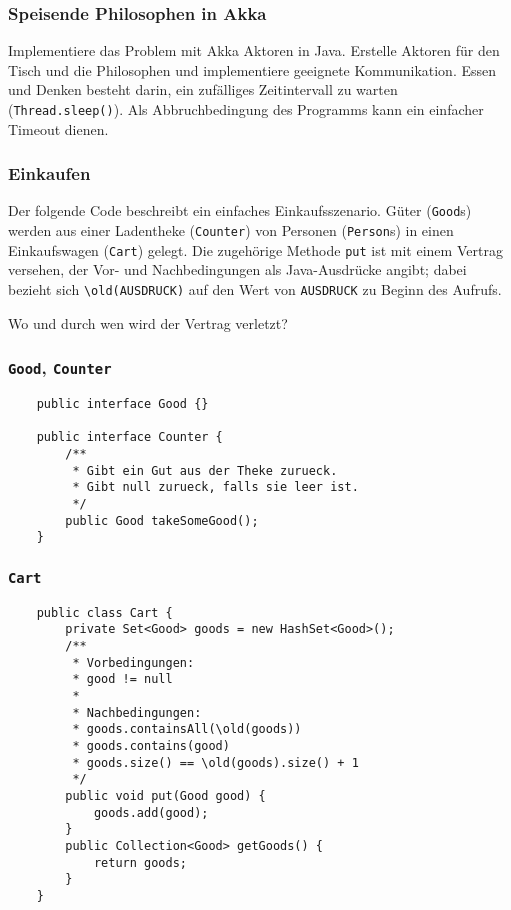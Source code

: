 \documentclass{beamer}
\begin{document}
\begin{frame}
  \frametitle{Speisende Philosophen in Akka}
  Implementiere das Problem mit Akka Aktoren in Java.
  Erstelle Aktoren für den Tisch und die Philosophen
  und implementiere geeignete Kommunikation.
  Essen und Denken besteht darin, ein zufälliges Zeitintervall zu warten (\lstinline{Thread.sleep()}).
  Als Abbruchbedingung des Programms kann ein einfacher Timeout dienen.
\end{frame}

\begin{frame}[fragile]
  \frametitle{Einkaufen}
  Der folgende Code beschreibt ein einfaches Einkaufsszenario.
  Güter (\lstinline{Good}s) werden aus einer Ladentheke (\lstinline{Counter})
  von Personen (\lstinline{Person}s) in einen Einkaufswagen (\lstinline{Cart}) gelegt.
  Die zugehörige Methode \lstinline{put} ist mit einem Vertrag versehen,
  der Vor- und Nachbedingungen als Java-Ausdrücke angibt;
  dabei bezieht sich \lstinline{\old(AUSDRUCK)}
  auf den Wert von \lstinline{AUSDRUCK} zu Beginn des Aufrufs.
  
  Wo und durch wen wird der Vertrag verletzt?
\end{frame}

\begin{frame}[fragile]
  \frametitle{\lstinline{Good}, \lstinline{Counter}}
  \begin{lstlisting}
    public interface Good {}
    
    public interface Counter {
        /**
         * Gibt ein Gut aus der Theke zurueck.
         * Gibt null zurueck, falls sie leer ist.
         */
        public Good takeSomeGood();
    }
  \end{lstlisting}
\end{frame}

\begin{frame}[fragile]
  \frametitle{\lstinline{Cart}}
  \begin{lstlisting}
    public class Cart {
        private Set<Good> goods = new HashSet<Good>();
        /**
         * Vorbedingungen:
         * good != null
         * 
         * Nachbedingungen:
         * goods.containsAll(\old(goods))
         * goods.contains(good)
         * goods.size() == \old(goods).size() + 1
         */
        public void put(Good good) {
            goods.add(good);
        }
        public Collection<Good> getGoods() {
            return goods;
        }
    }
  \end{lstlisting}
\end{frame}
\end{document}
